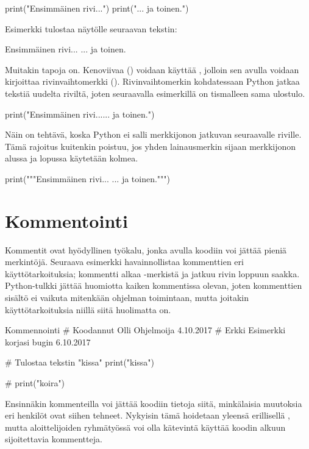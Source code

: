 \begin{python}
print("Ensimmäinen rivi...")
print("... ja toinen.")
\end{python}

Esimerkki tulostaa näytölle seuraavan tekstin:

\begin{output}
Ensimmäinen rivi...
... ja toinen.
\end{output}

Muitakin tapoja on. Kenoviivaa (\code{\textbackslash}) voidaan käyttää , jolloin sen avulla voidaan kirjoittaa rivinvaihtomerkki (). Rivinvaihtomerkin kohdatessaan Python jatkaa tekstiä uudelta riviltä, joten seuraavalla esimerkillä on tismalleen sama ulostulo.

\begin{python}
print("Ensimmäinen rivi...\n... ja toinen.")
\end{python}

Näin on tehtävä, koska Python ei salli merkkijonon jatkuvan seuraavalle riville. Tämä rajoitus kuitenkin poistuu, jos yhden lainausmerkin sijaan merkkijonon alussa ja lopussa käytetään kolmea.

\begin{python}
print("""Ensimmäinen rivi...
... ja toinen.""")
\end{python}

\section{Kommentointi}

Kommentit ovat hyödyllinen työkalu, jonka avulla koodiin voi jättää pieniä merkintöjä. Seuraava esimerkki havainnollistaa kommenttien eri käyttötarkoituksia; kommentti alkaa \code{\#}-merkistä ja jatkuu rivin loppuun saakka. Python-tulkki jättää huomiotta kaiken kommentissa olevan, joten kommenttien sisältö ei vaikuta mitenkään ohjelman toimintaan, mutta joitakin käyttötarkoituksia niillä siitä huolimatta on.

\begin{example}{Kommennointi}
# Koodannut Olli Ohjelmoija 4.10.2017
# Erkki Esimerkki korjasi bugin 6.10.2017

# Tulostaa tekstin "kissa"
print("kissa")

# print("koira")
\end{example}

Ensinnäkin kommenteilla voi jättää koodiin tietoja siitä, minkälaisia muutoksia eri henkilöt ovat siihen tehneet. Nykyisin tämä hoidetaan yleensä erillisellä , mutta aloittelijoiden ryhmätyössä voi olla kätevintä käyttää koodin alkuun sijoitettavia kommentteja.

